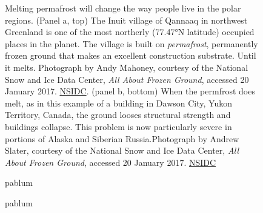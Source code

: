 \newpage
\begin{figure}[p]
\centering
{}


\caption{Melting permafrost will change the way people live in the polar regions. (Panel a, top) The Inuit village of Qannaaq in northwest Greenland is one of the most northerly (\ang{77.47}N latitude) occupied places in the planet. The village is built on \emph{permafrost}, permanently frozen ground that makes an excellent construction substrate. Until it melts. Photograph by Andy Mahoney, courtesy of the National Snow and Ice Data Center, \textsl{All About Frozen Ground}, accessed 20 January 2017. \href{https://nsidc.org/cryosphere/frozenground}{NSIDC}.  (panel b, bottom) When the permfrost does melt, as in this example of a building in Dawson City, Yukon Territory, Canada, the ground looses structural strength and buildings collapse. This problem is now particularly severe in portions of Alaska and Siberian Russia.Photograph by Andrew Slater, courtesy of the National Snow and Ice Data Center, \textsl{All About Frozen Ground}, accessed 20 January 2017. \href{https://nsidc.org/cryosphere/frozenground}{NSIDC}}

\label{fig:impermafrost}
\end{figure}


\newpage
\begin{figure}[p]
\centering
{}


\caption{pablum}

\label{fig:rcp_T}
\end{figure}

\newpage
\begin{figure}[p]
\centering
{}


\caption{pablum}

\label{fig:rcp_P}
\end{figure}


